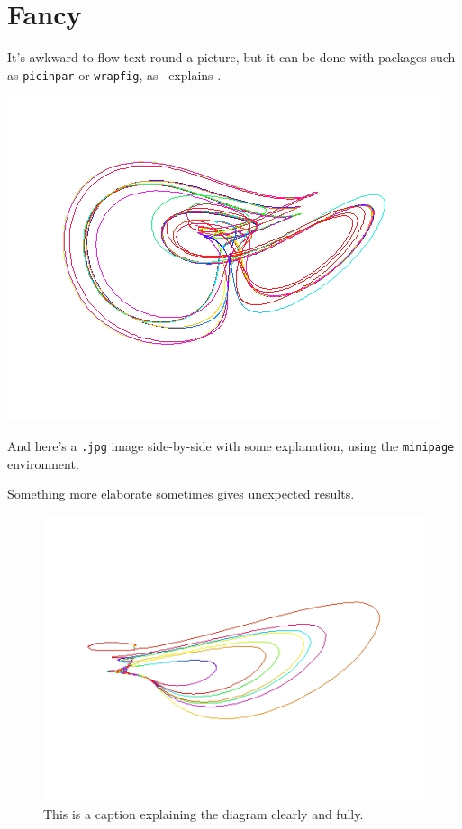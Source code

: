 \section{Fancy}
It's awkward to flow text round a picture, but it can be done with
packages such as \texttt{picinpar} or \texttt{wrapfig}, as \comp\
explains \cite[Sec.~6.4.1]{MG}.
\begin{center}
\begin{minipage}[c]{.45\textwidth}\centering
\includegraphics[width=.9\textwidth]{pic2.jpg}
\end{minipage}
\hfill\begin{minipage}[c]{.45\textwidth} And here's a \texttt{.jpg}
image side-by-side with some explanation, using the \texttt{minipage}
environment.\end{minipage}\end{center}
Something more elaborate sometimes gives unexpected results.
\par
\begin{figure}[ht]\centering
  \includegraphics[width=.7\textwidth]{pic3.jpg}
  \caption{This is a caption explaining the diagram 
clearly and fully.}\label{fig:pic}
\end{figure}
